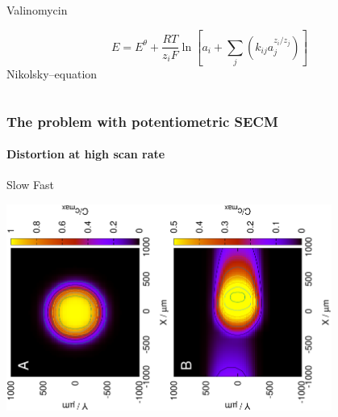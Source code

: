 \documentclass{beamer}
\begin{document}
\begin{frame}
\begin{columns}[T]
\begin{column}{.48\textwidth}
Valinomycin
\vfill

\footnotesize
\begin{equation*}
        E=E^\theta + \frac{RT}{z_iF} \ln \left [ a_i + \sum_{j} \left ( k_{ij}a_j^{z_i/z_j} \right ) \right ]
        \end{equation*}
\normalsize
Nikolsky--equation
\end{column}%
\end{columns}
\end{frame}

\begin{frame}
	\frametitle{The problem with potentiometric SECM} 
	\framesubtitle{Distortion at high scan rate}
	\centering
\quad\quad\quad\quad\quad\quad Slow \hfill Fast \quad\quad\quad\quad\quad\quad\quad

	\includegraphics[trim = 10mm 30mm 0mm 20mm, clip, width=0.4\textwidth, angle=-90]{real.eps}\hfill\includegraphics[trim = 10mm 30mm 0mm 20mm, clip, width=0.4\textwidth, angle=-90]{fastcomb_sim.eps}
\end{frame}
\end{document}
